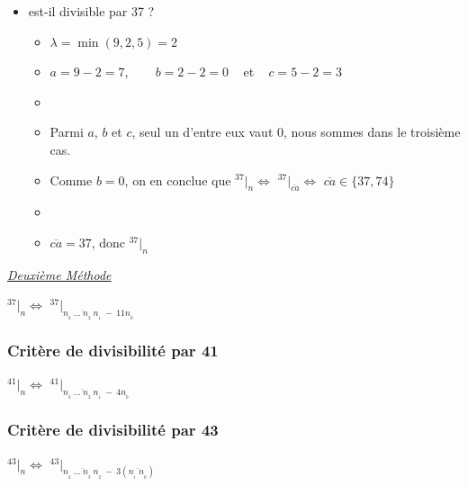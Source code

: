 \documentclass[a4paper]{article}
\begin{document}
\begin{itemize}

	\item[]  est-il divisible par 37 ?
	\begin{itemize}
		\item[] $\lambda =\min(9, 2, 5) = 2$
		\item[] $a = 9 - 2 = 7$, ~~~ $b = 2 - 2 = 0$ ~ et ~ $c = 5 - 2 = 3$
		\item[]
		\item[] Parmi $a$, $b$ et $c$, seul un d'entre eux vaut $0$, nous sommes dans le troisième cas.
		\item[] Comme $b = 0$, on en conclue que {\Large $ ^{37}|_n \Leftrightarrow$ $^{37}|_{\overline{ca} } \Leftrightarrow$} $\overline{ca} \in \{37,74\}$
		\item[] 
		\item[] $\overline{ca} = 37$, donc {\Large $ ^{37}|_n$}\\
	\end{itemize}

\end{itemize}



{\noindent  \textit{\underline{Deuxième Méthode}}}

\begin{center}
	\huge
	$ ^{37}|_n \Leftrightarrow$ $^{37}|_{\overline{n_{_{k}}~\dots~n_{_2}~n_{_1}}~-~11n_{_0}} $\\
\end{center}


\vfill
{\noindent \dotfill}


\subsubsection*{Critère de divisibilité par 41}

\begin{center}
	\huge
	$ ^{41}|_n \Leftrightarrow$ $^{41}|_{\overline{n_{_{k}}~\dots~n_{_2}~n_{_1}}~-~4n_{_0}} $
\end{center}


\vfill
{\noindent \dotfill}


\subsubsection*{Critère de divisibilité par 43}

\begin{center}
	\huge
	$ ^{43}|_n \Leftrightarrow$ $^{43}|_{\overline{n_{_{k}}~\dots~n_{_3}~n_{_2}}~-~3\left(\overline{n_{_1}~n_{_0}}\right)} $
\end{center}
\end{document}
